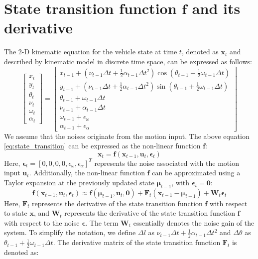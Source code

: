 \documentclass[12pt, a4paper]{article}
\begin{document}
\section{State transition function $\bm{f}$ and its derivative}
The 2-D kinematic equation for the vehicle state at time $t$, denoted as $\bm{x}_t$ and described by kinematic model in discrete time space, can be expressed as follows:
\begin{equation}
  \label{eq:state_transition}
  \begin{bmatrix}
    x_{t}\\
    y_{t}\\
    \theta_{t}\\
    \nu_{t}\\
    \omega_{t}\\
    \alpha_{t}
  \end{bmatrix}=
  \begin{bmatrix}
    x_{t-1} + (\nu_{t-1}\Delta t + \frac{1}{2}\alpha_{t-1}\Delta t^2) \cos(\theta_{t-1}+\frac{1}{2}\omega_{t-1}\Delta t)\\
    y_{t-1} + (\nu_{t-1}\Delta t + \frac{1}{2}\alpha_{t-1}\Delta t^2) \sin(\theta_{t-1}+\frac{1}{2}\omega_{t-1}\Delta t)\\
    \theta_{t-1} + \omega_{t-1}\Delta t\\
    \nu_{t-1} + \alpha_{t-1} \Delta t\\
    \omega_{t-1}+\epsilon_{\omega}\\
    \alpha_{t-1}+\epsilon_{\alpha}
  \end{bmatrix}
\end{equation}
We assume that the noises originate from the motion input. The above equation \eqref{eq:state_transition} can be expressed as the non-linear function $\bm{f}$:
\[
  \bm{x}_{t} = \bm{f}(\bm{x}_{t-1}, \bm{u}_{t},\bm{\epsilon}_{t})
\]
Here, $\bm{\epsilon}_{t}=[0, 0, 0, 0, \epsilon_{\omega}, \epsilon_{\alpha}]^{T}$ represents the noise associated with the motion input $\bm{u}_{t}$. Additionally, the non-linear function $\bm{f}$ can be approximated using a Taylor expansion at the previously updated state $\bm{\mu}_{t-1}$, with $\bm{\epsilon}_{t}=\bm{0}$:
\[
  \bm{f}(\bm{x}_{t-1}, \bm{u}_{t}, \bm{\epsilon}_{t}) \approx \bm{f}(\bm{\mu}_{t-1}, \bm{u}_{t}, \bm{0})+\bm{F}_{t}(\bm{x}_{t-1}-\bm{\mu}_{t-1})+\bm{W}_{t}\bm{\epsilon}_{t}
\]
Here, $\bm{F}_{t}$ represents the derivative of the state transition function $\bm{f}$ with respect to state $\bm{x}$, and $\bm{W}_{t}$ represents the derivative of the state transition function $\bm{f}$ with respect to the noise $\bm{\epsilon}$. The term $\bm{W}_{t}$ essentially denotes the noise gain of the system. To simplify the notation, we define $\Delta l$ as $\nu_{t-1}\Delta t + \frac{1}{2}\alpha_{t-1}\Delta t^2$ and $\Delta\theta$ as $\theta_{t-1} + \frac{1}{2}\omega_{t-1}\Delta t$. The derivative matrix of the state transition function $\bm{F}_{t}$ is denoted as:
\end{document}

